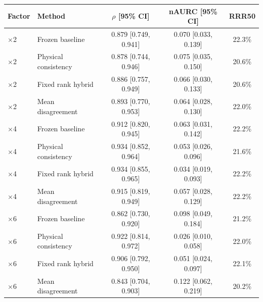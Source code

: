 \begin{tabular}{llccc}
\toprule
Factor & Method & $\rho$ [95\% CI] & nAURC [95\% CI] & RRR50 \\
\midrule
$\times$2 & Frozen baseline & 0.879 [0.749, 0.941] & 0.070 [0.033, 0.139] & 22.3\% \\
$\times$2 & Physical consistency & 0.878 [0.744, 0.946] & 0.075 [0.035, 0.150] & 20.6\% \\
$\times$2 & Fixed rank hybrid & 0.886 [0.757, 0.949] & 0.066 [0.030, 0.133] & 20.6\% \\
$\times$2 & Mean disagreement & 0.893 [0.770, 0.953] & 0.064 [0.028, 0.130] & 22.0\% \\
$\times$4 & Frozen baseline & 0.912 [0.820, 0.945] & 0.063 [0.031, 0.142] & 22.2\% \\
$\times$4 & Physical consistency & 0.934 [0.852, 0.964] & 0.053 [0.026, 0.096] & 21.6\% \\
$\times$4 & Fixed rank hybrid & 0.934 [0.855, 0.965] & 0.034 [0.019, 0.093] & 22.2\% \\
$\times$4 & Mean disagreement & 0.915 [0.819, 0.949] & 0.057 [0.028, 0.129] & 22.2\% \\
$\times$6 & Frozen baseline & 0.862 [0.730, 0.920] & 0.098 [0.049, 0.184] & 21.2\% \\
$\times$6 & Physical consistency & 0.922 [0.814, 0.972] & 0.026 [0.010, 0.058] & 22.0\% \\
$\times$6 & Fixed rank hybrid & 0.906 [0.792, 0.950] & 0.051 [0.024, 0.097] & 22.1\% \\
$\times$6 & Mean disagreement & 0.843 [0.704, 0.903] & 0.122 [0.062, 0.219] & 20.2\% \\
\bottomrule
\end{tabular}
